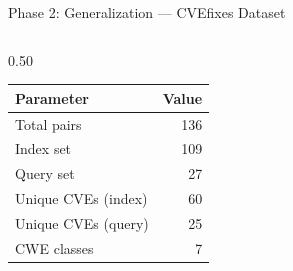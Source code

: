 \documentclass[aspectratio=169,10pt]{beamer}
\begin{document}
\begin{frame}{Phase 2: Generalization — CVEfixes Dataset}
\begin{columns}[T]
\begin{column}{0.50\textwidth}
\begin{center}
  {\scriptsize
  \renewcommand{\arraystretch}{1.2}
  \begin{tabular}{lr}
    \toprule
    \textbf{Parameter} & \textbf{Value} \\
    \midrule
    Total pairs & 136 \\
    Index set & 109 \\
    Query set & 27 \\
    Unique CVEs (index) & 60 \\
    Unique CVEs (query) & 25 \\
    CWE classes & 7 \\
    \bottomrule
  \end{tabular}}

    \end{center}
  
\end{column}
\end{columns}
\end{frame}
\end{document}
